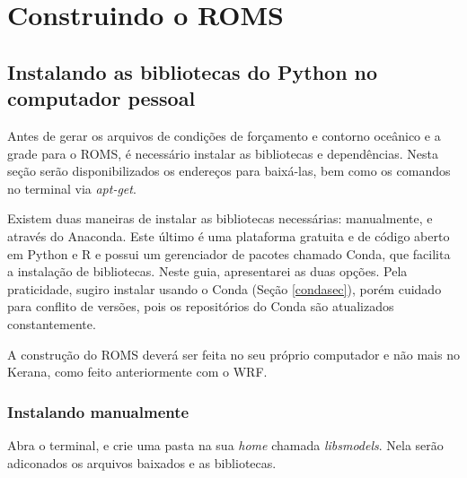\chapter{Construindo o ROMS}
\bigskip
\section{Instalando as bibliotecas do Python no computador pessoal}
\bigskip

\noindent Antes de gerar os arquivos de condições de forçamento e contorno oceânico e a grade para o ROMS, é necessário instalar as bibliotecas e dependências. Nesta seção serão disponibilizados os endereços para baixá-las, bem como os comandos no terminal via \textit{apt-get}.
\bigskip

\noindent Existem duas maneiras de instalar as bibliotecas necessárias: manualmente, e através do Anaconda. Este último é uma plataforma gratuita e de código aberto em Python e R e possui um gerenciador de pacotes chamado Conda, que facilita a instalação de bibliotecas. Neste guia, apresentarei as duas opções. Pela praticidade, sugiro instalar usando o Conda (Seção \textcolor{bleu_cite}{\ref{condasec}}), porém cuidado para conflito de versões, pois os repositórios do Conda são atualizados constantemente.
\bigskip

\begin{tcolorbox}[enhanced,
  grow to left by   = 0cm,
  grow to right by  = 0cm,
  enlarge top by    = 0cm,
  enlarge bottom by = 0cm,
  tcbox raise base,
  boxrule           = 1.0pt,
  left              = 18mm,
  colframe          = red!50!black,coltext=red!25!black,colback=red!10!white,
  overlay           = {\begin{tcbclipinterior}\fill[red!75!blue!50!white] (frame.south west)
    rectangle node[text=white,font=\sffamily\bfseries\footnotesize,rotate=0] {ATENÇÃO} ([xshift=18mm]frame.north west);\end{tcbclipinterior}}]
A construção do ROMS deverá ser feita no seu próprio computador e não mais no Kerana, como feito anteriormente com o WRF.
\end{tcolorbox}
\bigskip

\subsection{Instalando manualmente}
\bigskip
\noindent Abra o terminal, e crie uma pasta na sua \textit{home} chamada \textit{libsmodels}. Nela serão adiconados os arquivos baixados e as bibliotecas.
\bigskip

